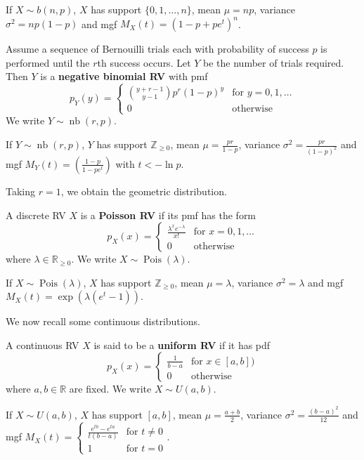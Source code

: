 If $X\sim b(n,p)$, $X$ has support $\{0,1,\hdots,n\}$, mean $\mu=np$, variance $\sigma^2=np(1-p)$ and mgf $M_X(t)=(1-p+pe^t)^n$.

\begin{definition}
	Assume a sequence of Bernouilli trials each with probability of success $p$ is performed until the $r$th success occurs. Let $Y$ be the number of trials required. Then $Y$ is a \textbf{negative binomial RV} with pmf $$p_Y(y)=\begin{cases}
		\binom{y+r-1}{y-1}p^r(1-p)^y & \text{for $y=0,1,\hdots$}\\
		0 & \text{otherwise}
	\end{cases}$$
	We write $Y\sim \mathop{nb}(r,p)$.
\end{definition}

If $Y\sim \mathop{nb}(r,p)$, $Y$ has support $\mathbb Z_{\geq 0}$, mean $\mu=\frac{pr}{1-p}$, variance $\sigma^2=\frac{pr}{(1-p)^2}$ and mgf $M_Y(t)=\left(\frac{1-p}{1-pe^t}\right)$ with $t<-\ln p$.

Taking $r=1$, we obtain the geometric distribution.

\begin{definition}[Poisson RV]
	A discrete RV $X$ is a \textbf{Poisson RV} if its pmf has the form $$p_X(x)=\begin{cases}
		\frac{\lambda^xe^{-\lambda}}{x!} & \text{for $x=0,1,\hdots$}\\
		0 & \text{otherwise}
	\end{cases}$$
	where $\lambda\in\mathbb R_{\geq 0}$. We write $X\sim \operatorname{Pois}(\lambda)$.
\end{definition}

If $X\sim \operatorname{Pois}(\lambda)$, $X$ has support $\mathbb Z_{\geq 0}$, mean $\mu=\lambda$, variance $\sigma^2=\lambda$ and mgf $M_X(t)=\exp(\lambda(e^t-1))$.

We now recall some continuous distributions.

\begin{definition}[uniform RV]
	A continuous RV $X$ is said to be a \textbf{uniform RV} if it has pdf
	$$p_X(x)=\begin{cases}
		\frac{1}{b-a} & \text{for $x\in[a,b])$}\\
		0 & \text{otherwise}
	\end{cases}$$
	where $a,b\in\mathbb R$ are fixed. We write $X\sim U(a,b)$.
\end{definition}

If $X\sim U(a,b)$, $X$ has support $[a,b]$, mean $\mu=\frac{a+b}{2}$, variance $\sigma^2=\frac{(b-a)^2}{12}$ and mgf $M_X(t)=\begin{cases}
	\frac{e^{tb}-e^{ta}}{t(b-a)} & \text{for $t\neq 0$}\\
	1 & \text{for $t= 0$}
\end{cases}$.

